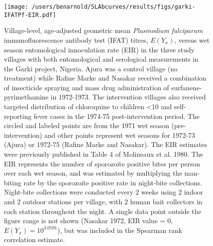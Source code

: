 \documentclass[11pt]{article}
\begin{document}
\clearpage
\begin{figure}[htbp]
\begin{center}
\texttt{[image: /users/benarnold/SLAbcurves/results/figs/garki-IFATPf-EIR.pdf]}
\begin{minipage}{\textwidth}
\caption{Village-level, age-adjusted geometric mean \textit{Plasmodium falciparum} immunofluorescence antibody test (IFAT) titres, $E(Y_x)$, versus wet season entomological innoculation rate (EIR) in the three study villages with both entomological and serological measurements in the Garki project, Nigeria. Ajura was a control village (no treatment) while Rafine Marke and Nasakar received a combination of insecticide spraying and mass drug administration of surfanene-pyrimethamine in 1972-1973. The intervention villages also received targeted distribution of chloroquine to children <10 and self-reporting fever cases in the 1974-75 post-intervention period. The circled and labeled points are from the 1971 wet season (pre-intervention) and other points represent wet seasons for 1972-73 (Ajura) or 1972-75 (Rafine Marke and Nasakar).  The EIR estimates were previously published in Table 4 of Molineaux et al. 1980. The EIR represents the number of sporozoite positive bites per person over each wet season, and was estimated by multiplying the man-biting rate by the sporozoite positive rate in night-bite collections. Night-bite collections were conducted every 2 weeks using 2 indoor and 2 outdoor stations per village, with 2 human bait collectors in each station throughout the night. A single data point outside the figure range is not shown (Nasakar 1972, EIR value = 0, $E(Y_x) = 10^{3.0591}$), but was included in the Spearman rank correlation estimate.  }
\label{fig:garkiEIR}
\end{minipage}
\end{center}
\end{figure}
\end{document}
